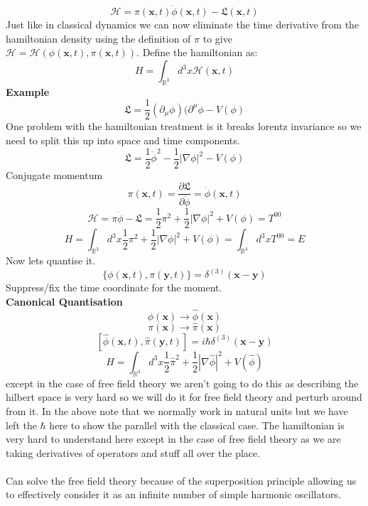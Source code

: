 \documentclass[12pt, a4paper, twoside, titlepage]{article}
\begin{document}
$$
\mathcal{H} = \pi(\bm x,t) \dot \phi(\bm x,t) - \mathfrak{L}(\bm x,t)
$$
Just like in classical dynamics we can now eliminate the time derivative from the hamiltonian density using the definition of $\pi$ to give $\mathcal{H} = \mathcal{H}(\phi(\bm x,t), \pi(\bm x,t))$. Define the hamiltonian as:
$$
H = \int_{\mathbb{R}^3} d^3x \mathcal{H}(\bm x,t)
$$
\textbf{Example}
$$
\mathfrak{L} = \frac{1}{2} (\partial_{\mu}\phi)(\partial^{\mu}\phi - V(\phi)
$$
One problem with the hamiltonian treatment is it breaks lorentz invariance so we need to split this up into space and time components.
$$
\mathfrak{L} = \frac{1}{2} \dot \phi^2 - \frac{1}{2}|\nabla \phi| ^2 - V(\phi)
$$
Conjugate momentum
$$
\pi(\bm x, t) = \frac{\partial \mathfrak{L}}{\partial \dot \phi} = \dot \phi(\bm x, t)
$$
$$
\mathcal{H} = \pi \dot \phi - \mathfrak{L} = \frac{1}{2} \pi^2  + \frac{1}{2}|\nabla \phi| ^2 +V(\phi) = T^{00}
$$
$$
H = \int_{\mathbb{R}^3} d^3x \frac{1}{2} \pi^2  + \frac{1}{2}|\nabla \phi| ^2 +V(\phi) =  \int_{\mathbb{R}^3} d^3x T^{00} = E 
$$
Now lets quantise it. 
$$
\{\phi(\bm x, t), \pi(\bm y, t)\} = \delta^{(3)}(\bm x - \bm y)
$$
Suppress/fix the time coordinate for the moment.\\
\textbf{Canonical Quantisation}
$$
\phi(\bm x) \rightarrow \hat \phi(\bm x)
$$
$$
\pi(\bm x) \rightarrow \hat \pi(\bm x)
$$
$$
[\hat \phi(\bm x, t), \hat \pi(\bm y, t)] = i \hbar \delta^{(3)}(\bm x - \bm y)
$$
$$
H = \int_{\mathbb{R}^3} d^3x \frac{1}{2} \hat \pi^2  + \frac{1}{2}|\nabla \hat \phi| ^2 +V(\hat \phi) $$
except in the case of free field theory we aren't going to do this as describing the hilbert space is very hard so we will do it for free field theory and perturb around from it. In the above note that we normally work in natural units but we have left the $\hbar$ here to show the parallel with the classical case. The hamiltonian is very hard to understand here except in the case of free field theory as we are taking derivatives of operators and stuff all over the place.\\\\
Can solve the free field theory because of the superposition principle allowing us to effectively consider it as an infinite number of simple harmonic oscillators.
\end{document}

